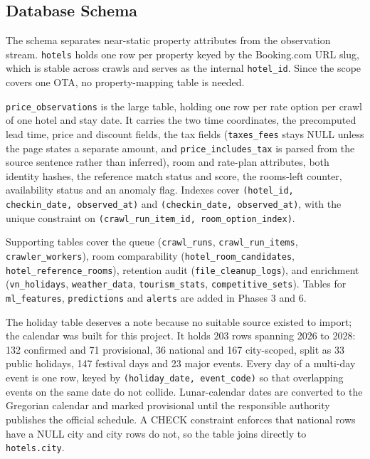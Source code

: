 \subsection{Database Schema}

The schema separates near-static property attributes from the observation stream. \texttt{hotels} holds one row per property keyed by the Booking.com URL slug, which is stable across crawls and serves as the internal \texttt{hotel\_id}. Since the scope covers one OTA, no property-mapping table is needed.

\texttt{price\_observations} is the large table, holding one row per rate option per crawl of one hotel and stay date. It carries the two time coordinates, the precomputed lead time, price and discount fields, the tax fields (\texttt{taxes\_fees} stays NULL unless the page states a separate amount, and \texttt{price\_includes\_tax} is parsed from the source sentence rather than inferred), room and rate-plan attributes, both identity hashes, the reference match status and score, the rooms-left counter, availability status and an anomaly flag. Indexes cover \texttt{(hotel\_id, checkin\_date, observed\_at)} and \texttt{(checkin\_date, observed\_at)}, with the unique constraint on \texttt{(crawl\_run\_item\_id, room\_option\_index)}.

Supporting tables cover the queue (\texttt{crawl\_runs}, \texttt{crawl\_run\_items}, \texttt{crawler\_workers}), room comparability (\texttt{hotel\_room\_candidates}, \texttt{hotel\_reference\_rooms}), retention audit (\texttt{file\_cleanup\_logs}), and enrichment (\texttt{vn\_holidays}, \texttt{weather\_data}, \texttt{tourism\_stats}, \texttt{competitive\_sets}). Tables for \texttt{ml\_features}, \texttt{predictions} and \texttt{alerts} are added in Phases 3 and 6.

The holiday table deserves a note because no suitable source existed to import; the calendar was built for this project. It holds 203 rows spanning 2026 to 2028: 132 confirmed and 71 provisional, 36 national and 167 city-scoped, split as 33 public holidays, 147 festival days and 23 major events. Every day of a multi-day event is one row, keyed by \texttt{(holiday\_date, event\_code)} so that overlapping events on the same date do not collide. Lunar-calendar dates are converted to the Gregorian calendar and marked provisional until the responsible authority publishes the official schedule. A CHECK constraint enforces that national rows have a NULL city and city rows do not, so the table joins directly to \texttt{hotels.city}.

